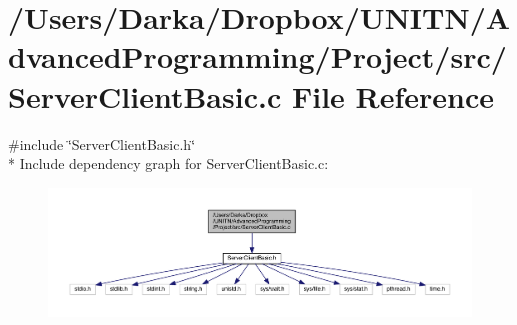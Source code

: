 \section{/\+Users/\+Darka/\+Dropbox/\+U\+N\+I\+T\+N/\+Advanced\+Programming/\+Project/src/\+Server\+Client\+Basic.c File Reference}
\label{_server_client_basic_8c}
{\ttfamily \#include \char`\"{}Server\+Client\+Basic.\+h\char`\"{}}\\*
Include dependency graph for Server\+Client\+Basic.\+c\+:\nopagebreak
\begin{figure}[H]
\begin{center}
\leavevmode
\includegraphics[width=350pt]{_server_client_basic_8c__incl}
\end{center}
\end{figure}
